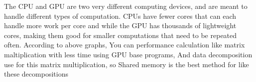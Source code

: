 \pagebreak
\bigbreak
The CPU and GPU are two very different computing devices, and are meant to handle different types of computation. CPUs have fewer cores that can each handle more work per core and while the GPU has thousands of lightweight cores, making them good for smaller computations that need to be repeated often.
\bigbreak		
According to above graphs, You can performance calculation like matrix maltiplication with less time using GPU base programs, And data decomposition use for this matrix multiplication, so Shared memory is the best method for like these decompositions

